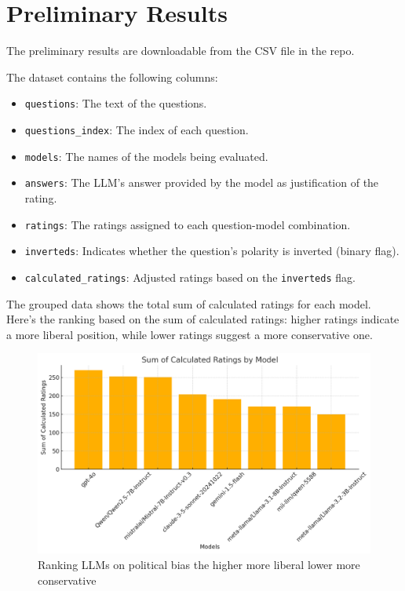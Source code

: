 \documentclass{article}
\begin{document}
\section{Preliminary Results}
The preliminary results are downloadable from the CSV file in the repo.

The dataset contains the following columns:
\begin{itemize}
    \item \texttt{questions}: The text of the questions.
    \item \texttt{questions\_index}: The index of each question.
    \item \texttt{models}: The names of the models being evaluated.
    \item \texttt{answers}: The LLM's answer provided by the model as justification of the rating.
    \item \texttt{ratings}: The ratings assigned to each question-model combination.
    \item \texttt{inverteds}: Indicates whether the question's polarity is inverted (binary flag).
    \item \texttt{calculated\_ratings}: Adjusted ratings based on the \texttt{inverteds} flag.
\end{itemize}

The grouped data shows the total sum of calculated ratings for each model. Here's the ranking based on the sum of calculated ratings: higher ratings indicate a more liberal position, while lower ratings suggest a more conservative one.

\begin{figure}[h!]
    \centering
    \includegraphics[width=\textwidth]{ranking.png}
    \caption{Ranking LLMs on political bias the higher more liberal lower more conservative}
    \label{fig:ranking}
\end{figure}
\end{document}
